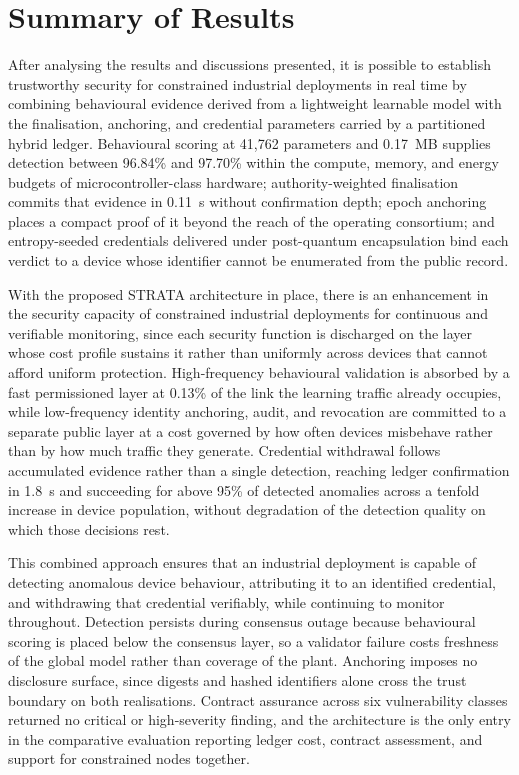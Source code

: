 \section{Summary of Results}
\label{sec:eval-summary}

After analysing the results and discussions presented, it is possible to establish trustworthy security for constrained industrial deployments in real time by combining behavioural evidence derived from a lightweight learnable model with the finalisation, anchoring, and credential parameters carried by a partitioned hybrid ledger. Behavioural scoring at 41{,}762 parameters and 0.17~MB supplies detection between 96.84\% and 97.70\% within the compute, memory, and energy budgets of microcontroller-class hardware; authority-weighted finalisation commits that evidence in 0.11~s without confirmation depth; epoch anchoring places a compact proof of it beyond the reach of the operating consortium; and entropy-seeded credentials delivered under post-quantum encapsulation bind each verdict to a device whose identifier cannot be enumerated from the public record.

With the proposed STRATA architecture in place, there is an enhancement in the security capacity of constrained industrial deployments for continuous and verifiable monitoring, since each security function is discharged on the layer whose cost profile sustains it rather than uniformly across devices that cannot afford uniform protection. High-frequency behavioural validation is absorbed by a fast permissioned layer at 0.13\% of the link the learning traffic already occupies, while low-frequency identity anchoring, audit, and revocation are committed to a separate public layer at a cost governed by how often devices misbehave rather than by how much traffic they generate. Credential withdrawal follows accumulated evidence rather than a single detection, reaching ledger confirmation in 1.8~s and succeeding for above 95\% of detected anomalies across a tenfold increase in device population, without degradation of the detection quality on which those decisions rest.

This combined approach ensures that an industrial deployment is capable of detecting anomalous device behaviour, attributing it to an identified credential, and withdrawing that credential verifiably, while continuing to monitor throughout. Detection persists during consensus outage because behavioural scoring is placed below the consensus layer, so a validator failure costs freshness of the global model rather than coverage of the plant. Anchoring imposes no disclosure surface, since digests and hashed identifiers alone cross the trust boundary on both realisations. Contract assurance across six vulnerability classes returned no critical or high-severity finding, and the architecture is the only entry in the comparative evaluation reporting ledger cost, contract assessment, and support for constrained nodes together.

